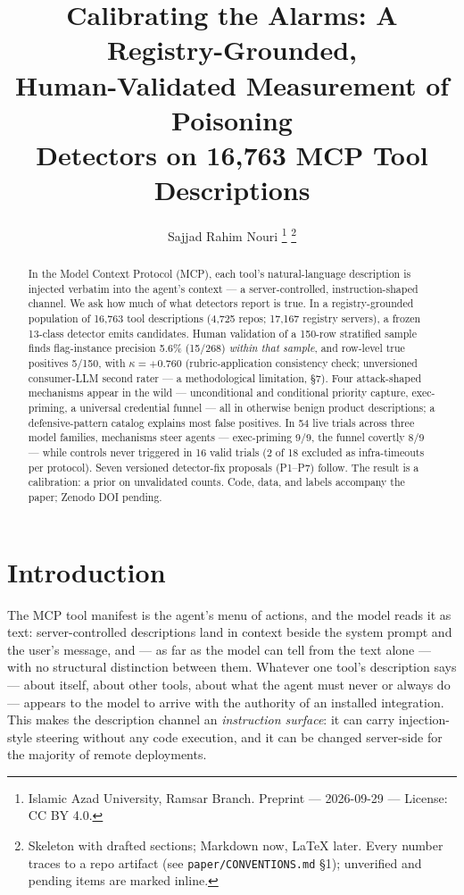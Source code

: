 \documentclass[10pt,conference]{IEEEtran}
\title{\LARGE\bf Calibrating the Alarms: A Registry-Grounded,\\ Human-Validated Measurement of Poisoning\\ Detectors on 16{,}763 MCP Tool Descriptions}
\author{Sajjad Rahim Nouri%
\thanks{Islamic Azad University, Ramsar Branch. Preprint --- 2026-09-29 --- License: CC BY 4.0.}%
\thanks{Skeleton with drafted sections; Markdown now, LaTeX later. Every number traces to a repo artifact (see \texttt{paper/CONVENTIONS.md} \S1); unverified and pending items are marked inline.}}
\begin{document}
\maketitle

\begin{abstract}
In the Model Context Protocol (MCP), each tool's natural-language description is
injected verbatim into the agent's context --- a server-controlled, instruction-shaped
channel. We ask how much of what detectors report is true. In a
registry-grounded population of 16,763 tool descriptions (4,725 repos; 17,167
registry servers), a frozen 13-class detector emits candidates. Human validation of a
150-row stratified sample finds flag-instance precision 5.6\% (15/268) \emph{within that
sample}, and row-level true positives 5/150, with $\kappa = +0.760$ (rubric-application consistency check;
unversioned consumer-LLM second rater --- a methodological limitation, \S7). Four attack-shaped
mechanisms appear in the wild --- unconditional and conditional priority capture,
exec-priming, a universal credential funnel --- all in otherwise benign product
descriptions; a
defensive-pattern catalog explains most false positives. In 54 live trials across three
model families, mechanisms steer agents --- exec-priming 9/9, the funnel covertly 8/9 ---
while controls never triggered in 16 valid trials (2 of 18 excluded as infra-timeouts
per protocol). Seven versioned detector-fix proposals (P1--P7) follow.
The result is a calibration: a prior on unvalidated counts. Code, data, and labels
accompany the paper; Zenodo DOI pending.
\end{abstract}

\setcounter{section}{1}

\section{Introduction}\label{sec:intro}

The MCP tool manifest is the agent's menu of actions, and the model reads it as text:
server-controlled descriptions land in context beside the system prompt and the user's
message, and --- as far as the model can tell from the text alone --- with no structural
distinction between them. Whatever one tool's description
says --- about itself, about other tools, about what the agent must never or always do ---
appears to the model to arrive with the authority of an installed integration. This makes
the description channel an \emph{instruction surface}: it can carry injection-style steering
without any code execution, and it can be changed server-side for the majority of remote
deployments.
\end{document}
